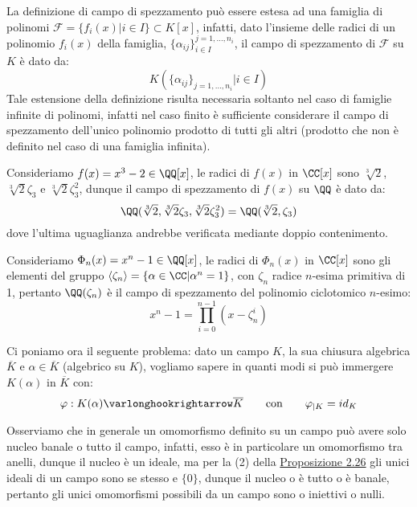 \documentclass[11pt]{scrartcl}
\begin{document}
\begin{remark}
    La definizione di campo di spezzamento può essere estesa ad una famiglia di polinomi $\mathcal{F} = \{f_i(x) | i \in I\} \subset K[x]$, infatti, dato l'insieme delle radici di un polinomio $f_i(x)$ della famiglia,
    $ \{\alpha_{ij}\}_{i \in I}^{j = 1,\ldots,n_i} $, il campo di spezzamento di $\mathcal{F}$ su $K$ è dato da:
    \[ K(\{\alpha_{ij}\}_{j = 1,\ldots,n_i} | i \in I)
        \]
    Tale estensione della definizione risulta necessaria soltanto nel caso di famiglie infinite di polinomi, infatti nel caso finito è sufficiente considerare il campo di spezzamento dell'unico polinomio prodotto di tutti gli altri 
    (prodotto che non è definito nel caso di una famiglia infinita).
\end{remark}

\begin{example}
    Consideriamo $f(x) = x^3 - 2 \in \QQ[x]$, le radici di $f(x)$ in $\CC[x]$ sono $\sqrt[3]{2}$,$\sqrt[3]{2}\zeta_3$ e $\sqrt[3]{2}\zeta_3^2$, dunque il campo di spezzamento di $f(x)$ su $\QQ$ è dato da:
    \[ \QQ(\sqrt[3]{2},\sqrt[3]{2}\zeta_3,\sqrt[3]{2}\zeta_3^2) = \QQ(\sqrt[3]{2},\zeta_3)
        \]
    dove l'ultima uguaglianza andrebbe verificata mediante doppio contenimento.
\end{example}

\begin{example}
    Consideriamo $\Phi_n(x) = x^n - 1 \in \QQ[x]$, le radici di $\Phi_n(x)$ in $\CC[x]$ sono gli elementi del gruppo $\left<\zeta_n\right> = \{\alpha \in \CC | \alpha^n = 1\}$, con $\zeta_n$ radice $n$-esima primitiva di 1,
    pertanto $\QQ(\zeta_n)$ è il campo di spezzamento del polinomio ciclotomico $n$-esimo:
    \[ x^n - 1 = \prod_{i = 0}^{n-1} (x - \zeta_n^i)
        \]
\end{example}

Ci poniamo ora il seguente problema: dato un campo $K$, la sua chiusura algebrica $\overline K$ e $\alpha \in \overline K$ (algebrico su $K$), vogliamo sapere in quanti modi si può immergere $K(\alpha)$ in $\overline K$ con:
\[ \varphi : K(\alpha) \varlonghookrightarrow \overline K \qquad \text{con} \qquad \varphi_{|K} = id_K
    \]

\begin{remark}
    \label{3.32}
Osserviamo che in generale un omomorfismo definito su un campo può avere solo nucleo banale o tutto il campo, infatti, esso è in particolare un omomorfismo tra anelli, dunque il nucleo è un ideale, ma per la (2) della \hyperref[2.26]{Proposizione 2.26} gli unici ideali di un campo 
sono se stesso e $\{0\}$, dunque il nucleo o è tutto o è banale, pertanto gli unici omomorfismi possibili da un campo sono o iniettivi o nulli.    
\end{remark}
\end{document}
